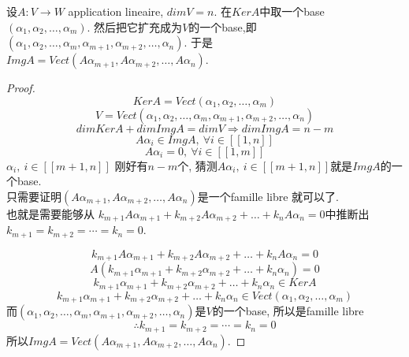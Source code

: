 \documentclass{book}
\begin{document}
\begin{theorem}
设$A: V \rightarrow W$ application lineaire, $dim V = n$.
在$KerA$中取一个base $(\alpha_1, \alpha_2, \ldots, \alpha_m)$.
然后把它扩充成为$V$的一个base,即$(\alpha_1, \alpha_2, \ldots, \alpha_m, \alpha_{m + 1}, \alpha_{m + 2}, \ldots, \alpha_n)$.
于是$Img A = Vect(A \alpha_{m + 1}, A \alpha_{m + 2}, \ldots, A \alpha_n)$.
\end{theorem}
\begin{proof}
$$Ker A = Vect(\alpha_1, \alpha_2, \ldots, \alpha_m)$$
$$V = Vect(\alpha_1, \alpha_2, \ldots, \alpha_m, \alpha_{m + 1}, \alpha_{m + 2}, \ldots, \alpha_n)$$
$$dim Ker A + dim Img A = dim V \Rightarrow dim Img A = n - m$$
$$A \alpha_i \in Img A,~ \forall i \in [[1, n]]$$
$$A \alpha_i = 0,~ \forall i \in [[1, m]]$$
$\alpha_i,~ i \in [[m + 1, n]]$ 刚好有$n - m$个, 猜测$A \alpha_i,~ i \in [[m + 1, n]]$就是$Img A$的一个base. \\
只需要证明$(A \alpha_{m + 1}, A \alpha_{m + 2}, \ldots, A \alpha_n)$是一个famille libre 就可以了. \\
也就是需要能够从 $k_{m + 1} A \alpha_{m + 1} + k_{m + 2} A \alpha_{m + 2} + \ldots + k_n A \alpha_n = 0$中推断出 $k_{m + 1} = k_{m + 2} = \cdots = k_n = 0$.

$$k_{m + 1} A \alpha_{m + 1} + k_{m + 2} A \alpha_{m + 2} + \ldots + k_n A \alpha_n = 0$$
$$A(k_{m + 1} \alpha_{m + 1} + k_{m + 2} \alpha_{m + 2} + \ldots + k_n \alpha_n) = 0$$
$$k_{m + 1} \alpha_{m + 1} + k_{m + 2} \alpha_{m + 2} + \ldots + k_n \alpha_n \in Ker A$$
$$k_{m + 1} \alpha_{m + 1} + k_{m + 2} \alpha_{m + 2} + \ldots + k_n \alpha_n \in Vect(\alpha_1, \alpha_2, \ldots, \alpha_m)$$
而$(\alpha_1, \alpha_2, \ldots, \alpha_m, \alpha_{m + 1}, \alpha_{m + 2}, \ldots, \alpha_n)$是$V$的一个base, 所以是famille libre
$$\therefore k_{m + 1} = k_{m + 2} = \cdots = k_n = 0$$
所以$Img A = Vect(A \alpha_{m + 1}, A \alpha_{m + 2}, \ldots, A \alpha_n)$.
\end{proof}
\end{document}
